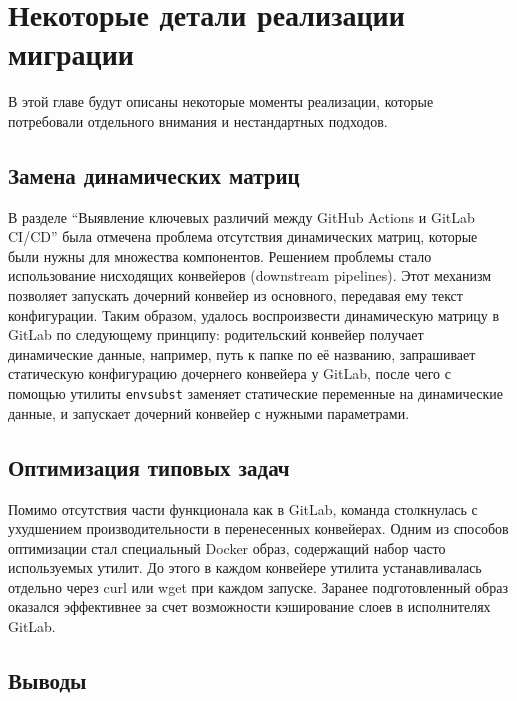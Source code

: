 \chapter{Некоторые детали реализации миграции} \label{ch:ch3}
В этой главе будут описаны некоторые моменты реализации, которые потребовали отдельного внимания и нестандартных подходов.

\section{Замена динамических матриц} \label{sec:dymamic-matricies}
В разделе \enquote{Выявление ключевых различий между GitHub Actions и GitLab CI/CD}\cite{sec:gh-and-gl-differences} была
отмечена проблема отсутствия динамических матриц, которые были нужны для множества компонентов.
Решением проблемы стало использование нисходящих конвейеров (downstream pipelines).
Этот механизм позволяет запускать дочерний конвейер из основного, передавая ему текст конфигурации.
Таким образом, удалось воспроизвести динамическую матрицу в GitLab по следующему принципу:
родительский конвейер получает динамические данные, например, путь к папке по её названию,
запрашивает статическую конфигурацию дочернего конвейера у GitLab,
после чего с помощью утилиты \texttt{envsubst} заменяет статические переменные на динамические данные,
и запускает дочерний конвейер с нужными параметрами.

\section{Оптимизация типовых задач} \label{sec:common-tasks-optimization}
Помимо отсутствия части функционала как в GitLab, команда столкнулась с ухудшением производительности в перенесенных конвейерах.
Одним из способов оптимизации стал специальный Docker образ, содержащий набор часто используемых утилит.
До этого в каждом конвейере утилита устанавливалась отдельно через curl или wget при каждом запуске.
Заранее подготовленный образ оказался эффективнее за счет возможности кэширование слоев в исполнителях GitLab.

\section{Выводы} \label{sec:conclusion}
